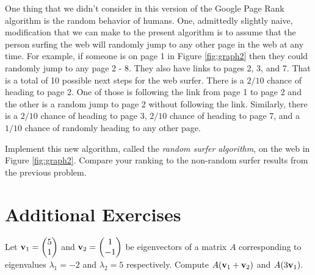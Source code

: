 \begin{problem}
    One thing that we didn't consider in this version of the Google Page Rank algorithm is
    the random behavior of humans.  One, admittedly slightly naive, modification that we
    can make to the present algorithm is to assume that the person surfing the web will
    randomly jump to any other page in the web at any time.  For example, if someone is on
    page 1 in Figure \ref{fig:graph2} then they could randomly jump to any page 2 - 8.
    They also have links to pages 2, 3, and 7.  That is a total of 10 possible next steps
    for the web surfer.  There is a $2/10$ chance of heading to page 2.  One of those is
    following the link from page 1 to page 2 and the other is a random jump to page 2
    without following the link.  Similarly, there is a $2/10$ chance of
    heading to page 3, $2/10$ chance of heading to page 7, and a $1/10$ chance of randomly
    heading to any other page.

    Implement this new algorithm, called the {\it random surfer algorithm}, on the web in
    Figure \ref{fig:graph2}.  Compare your ranking to the non-random surfer results from
    the previous problem.
\end{problem}


\section{Additional Exercises}
\begin{problem}
    Let ${\bf v}_1 = \begin{pmatrix} 5\\1\end{pmatrix}$ and ${\bf v}_2 =
    \begin{pmatrix}1\\-1\end{pmatrix}$ be eigenvectors of a matrix $A$ corresponding to
    eigenvalues $\lambda_1 = -2$ and $\lambda_2 = 5$ respectively.  Compute $A({\bf v}_1 +
    {\bf v}_2)$ and $A(3{\bf v}_1)$.
\end{problem}

